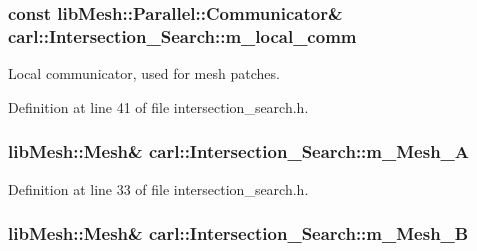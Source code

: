 \subsubsection[{m\+\_\+local\+\_\+comm}]{\setlength{\rightskip}{0pt plus 5cm}const lib\+Mesh\+::\+Parallel\+::\+Communicator\& carl\+::\+Intersection\+\_\+\+Search\+::m\+\_\+local\+\_\+comm\hspace{0.3cm}{\ttfamily [protected]}}\label{classcarl_1_1_intersection___search_a15b8deaf751e8d0fb91d8e7eed9aefb6}


Local communicator, used for mesh patches. 



Definition at line 41 of file intersection\+\_\+search.\+h.

\hypertarget{classcarl_1_1_intersection___search_a903b7b3a369ed2c1e80d6a20ba41d350}{}
\subsubsection[{m\+\_\+\+Mesh\+\_\+\+A}]{\setlength{\rightskip}{0pt plus 5cm}lib\+Mesh\+::\+Mesh\& carl\+::\+Intersection\+\_\+\+Search\+::m\+\_\+\+Mesh\+\_\+\+A\hspace{0.3cm}{\ttfamily [protected]}}\label{classcarl_1_1_intersection___search_a903b7b3a369ed2c1e80d6a20ba41d350}


Definition at line 33 of file intersection\+\_\+search.\+h.

\hypertarget{classcarl_1_1_intersection___search_a178cd617f59285fb858fddd78dec79d6}{}
\subsubsection[{m\+\_\+\+Mesh\+\_\+\+B}]{\setlength{\rightskip}{0pt plus 5cm}lib\+Mesh\+::\+Mesh\& carl\+::\+Intersection\+\_\+\+Search\+::m\+\_\+\+Mesh\+\_\+\+B\hspace{0.3cm}{\ttfamily [protected]}}\label{classcarl_1_1_intersection___search_a178cd617f59285fb858fddd78dec79d6}


